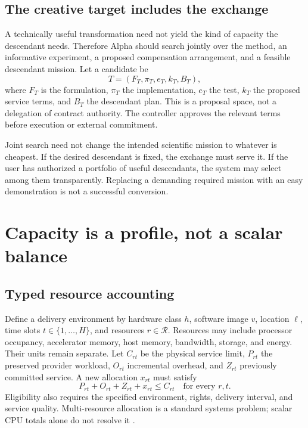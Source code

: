 \documentclass[11pt,letterpaper]{article}
\theoremstyle{remark}\newtheorem{remark}{Remark}[section]
\begin{document}
\subsection{The creative target includes the exchange}
A technically useful transformation need not yield the kind of capacity the descendant needs. Therefore Alpha should search jointly over the method, an informative experiment, a proposed compensation arrangement, and a feasible descendant mission. Let a candidate be
\begin{equation}
T=(F_T,\pi_T,e_T,k_T,B_T),
\end{equation}
where $F_T$ is the formulation, $\pi_T$ the implementation, $e_T$ the test, $k_T$ the proposed service terms, and $B_T$ the descendant plan. This is a proposal space, not a delegation of contract authority. The controller approves the relevant terms before execution or external commitment.

Joint search need not change the intended scientific mission to whatever is cheapest. If the desired descendant is fixed, the exchange must serve it. If the user has authorized a portfolio of useful descendants, the system may select among them transparently. Replacing a demanding required mission with an easy demonstration is not a successful conversion.

\section{Capacity is a profile, not a scalar balance}
\label{sec:capacity}
\subsection{Typed resource accounting}
Define a delivery environment by hardware class $h$, software image $v$, location $\ell$, time slots $t\in\{1,\ldots,H\}$, and resources $r\in\mathcal R$. Resources may include processor occupancy, accelerator memory, host memory, bandwidth, storage, and energy. Their units remain separate. Let $C_{rt}$ be the physical service limit, $P_{rt}$ the preserved provider workload, $O_{rt}$ incremental overhead, and $Z_{rt}$ previously committed service. A new allocation $x_{rt}$ must satisfy
\begin{equation}\label{eq:physical}
P_{rt}+O_{rt}+Z_{rt}+x_{rt}\le C_{rt}\quad\text{for every }r,t.
\end{equation}
Eligibility also requires the specified environment, rights, delivery interval, and service quality. Multi-resource allocation is a standard systems problem; scalar CPU totals alone do not resolve it \citep{ghodsi,borg}.
\end{document}
